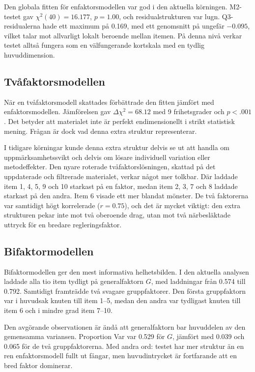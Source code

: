 \documentclass[11pt,a4paper]{article}
\begin{document}
Den globala fitten för enfaktorsmodellen var god i den aktuella körningen. M2-testet gav $\chi^2(40)=16.177$, $p=1.00$, och residualstrukturen var lugn. Q3-residualerna hade ett maximum på 0.169, med ett genomsnitt på ungefär $-0.095$, vilket talar mot allvarligt lokalt beroende mellan itemen. På denna nivå verkar testet alltså fungera som en välfungerande kortskala med en tydlig huvuddimension.

\subsection{Tvåfaktorsmodellen}
När en tvåfaktorsmodell skattades förbättrade den fitten jämfört med enfaktorsmodellen. Jämförelsen gav $\Delta \chi^2 = 68.12$ med 9 frihetsgrader och $p < .001$. Det betyder att materialet inte är perfekt endimensionellt i strikt statistisk mening. Frågan är dock vad denna extra struktur representerar.

I tidigare körningar kunde denna extra struktur delvis se ut att handla om uppmärksamhetssvikt och delvis om lösare individuell variation eller metodeffekter. Den nyare roterade tvåfaktorslösningen, skattad på det uppdaterade och filtrerade materialet, verkar något mer tolkbar. Där laddade item 1, 4, 5, 9 och 10 starkast på en faktor, medan item 2, 3, 7 och 8 laddade starkast på den andra. Item 6 visade ett mer blandat mönster. De två faktorerna var samtidigt högt korrelerade ($r = 0.75$), och det är mycket viktigt: den extra strukturen pekar inte mot två oberoende drag, utan mot två närbesläktade uttryck för en bredare regleringsfaktor.

\subsection{Bifaktormodellen}
Bifaktormodellen ger den mest informativa helhetsbilden. I den aktuella analysen laddade alla tio item tydligt på generalfaktorn $G$, med laddningar från 0.574 till 0.792. Samtidigt framträdde två svagare gruppfaktorer. Den första gruppfaktorn var i huvudsak knuten till item 1--5, medan den andra var tydligast knuten till item 6 och i mindre grad item 7--10.

Den avgörande observationen är ändå att generalfaktorn bar huvuddelen av den gemensamma variansen. Proportion Var var 0.529 för $G$, jämfört med 0.039 och 0.065 för de två gruppfaktorerna. Med andra ord: testet har mer struktur än en ren enfaktorsmodell fullt ut fångar, men huvudintrycket är fortfarande att en bred faktor dominerar.
\end{document}

